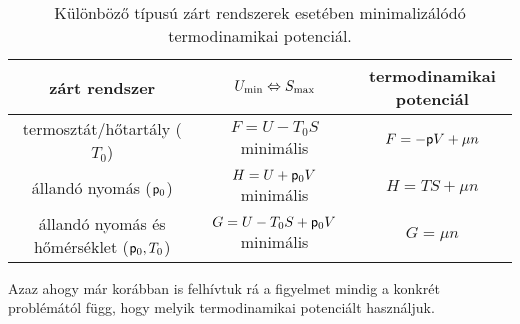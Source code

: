 \begin{table}[htb]
\centering
\begin{adjustbox}{width=1.15\textwidth, center=\textwidth}
\begin{tabular}{|c||c|c|} \hline
zárt rendszer & $U_{\textnormal{min}}\Leftrightarrow S_{\textnormal{max}}$ & termodinamikai potenciál\\ \hline\hline
termosztát/hőtartály ($T_0$) & $F=U-T_0S$ minimális & $F=-\mathsf p V+\mu n$\\ \hline
állandó nyomás ($\mathsf p_0$) & $H=U+\mathsf p_0 V$ minimális & $H=TS+\mu n$ \\ \hline
állandó nyomás és hőmérséklet ($\mathsf p_0,T_0$) & $G=U-T_0S+\mathsf p_0V$ minimális & $G=\mu n$\\ \hline
\end{tabular}
\end{adjustbox}
\caption{Különböző típusú zárt rendszerek esetében minimalizálódó termodinamikai potenciál.}
\label{tab:egyensuly}
\end{table}
Azaz ahogy már korábban is felhívtuk rá a figyelmet mindig a konkrét problémától függ, hogy melyik termodinamikai potenciált használjuk.
